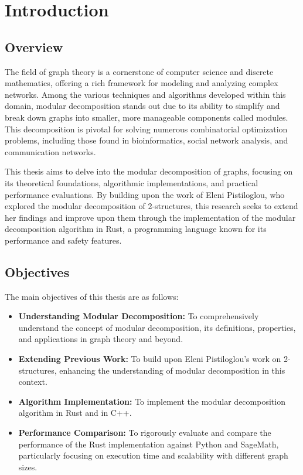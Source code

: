 
\chapter{Introduction}\label{ch:introduction}


\section{Overview}\label{sec:overview}

The field of graph theory is a cornerstone of computer science and discrete mathematics, offering a rich framework for modeling and analyzing complex networks.
Among the various techniques and algorithms developed within this domain, modular decomposition stands out due to its ability to simplify and break down graphs into smaller, more manageable components called modules.
This decomposition is pivotal for solving numerous combinatorial optimization problems, including those found in bioinformatics, social network analysis, and communication networks.

This thesis aims to delve into the modular decomposition of graphs, focusing on its theoretical foundations, algorithmic implementations, and practical performance evaluations.
By building upon the work of Eleni Pistiloglou, who explored the modular decomposition of 2-structures, this research seeks to extend her findings and improve upon them through the implementation of the modular decomposition algorithm in Rust, a programming language known for its performance and safety features.


\section{Objectives}\label{sec:objectives}

The main objectives of this thesis are as follows:

\begin{itemize}
    \item \textbf{Understanding Modular Decomposition:} To comprehensively understand the concept of modular decomposition, its definitions, properties, and applications in graph theory and beyond.
    \item \textbf{Extending Previous Work:} To build upon Eleni Pistiloglou's work on 2-structures, enhancing the understanding of modular decomposition in this context.
    \item \textbf{Algorithm Implementation:} To implement the modular decomposition algorithm in Rust and in C++.
    \item \textbf{Performance Comparison:} To rigorously evaluate and compare the performance of the Rust implementation against Python and SageMath, particularly focusing on execution time and scalability with different graph sizes.
\end{itemize}


